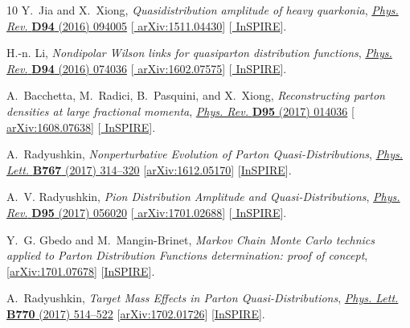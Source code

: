 \begin{thebibliography}{10}
Y.~Jia and X.~Xiong, {\it {Quasidistribution amplitude of heavy quarkonia}},
\href{http://dx.doi.org/10.1103/PhysRevD.94.094005}{{\em Phys. Rev.} {\bfseries
  D94} (2016) 094005} [\href{http://arxiv.org/abs/1511.04430}{{\ttfamily
  arXiv:1511.04430}}] [\href{http://inspirehep.net/record/1404098}{{\ttfamily
  InSPIRE}}].

H.-n. Li, {\it {Nondipolar Wilson links for quasiparton distribution
  functions}},
\href{http://dx.doi.org/10.1103/PhysRevD.94.074036}{{\em Phys. Rev.} {\bfseries
  D94} (2016) 074036} [\href{http://arxiv.org/abs/1602.07575}{{\ttfamily
  arXiv:1602.07575}}] [\href{http://inspirehep.net/record/1423310}{{\ttfamily
  InSPIRE}}].

A.~Bacchetta, M.~Radici, B.~Pasquini, and X.~Xiong, {\it {Reconstructing parton
  densities at large fractional momenta}},
\href{http://dx.doi.org/10.1103/PhysRevD.95.014036}{{\em Phys. Rev.} {\bfseries
  D95} (2017) 014036} [\href{http://arxiv.org/abs/1608.07638}{{\ttfamily
  arXiv:1608.07638}}] [\href{http://inspirehep.net/record/1484292}{{\ttfamily
  InSPIRE}}].

A.~Radyushkin, {\it {Nonperturbative Evolution of Parton Quasi-Distributions}},
\href{http://dx.doi.org/10.1016/j.physletb.2017.02.019}{{\em Phys. Lett.}
  {\bfseries B767} (2017) 314--320}
  [\href{http://arxiv.org/abs/1612.05170}{{\ttfamily arXiv:1612.05170}}]
  [\href{http://inspirehep.net/record/1504066}{{\ttfamily InSPIRE}}].

A.~V. Radyushkin, {\it {Pion Distribution Amplitude and Quasi-Distributions}},
\href{http://dx.doi.org/10.1103/PhysRevD.95.056020}{{\em Phys. Rev.} {\bfseries
  D95} (2017) 056020} [\href{http://arxiv.org/abs/1701.02688}{{\ttfamily
  arXiv:1701.02688}}] [\href{http://inspirehep.net/record/1508491}{{\ttfamily
  InSPIRE}}].

Y.~G. Gbedo and M.~Mangin-Brinet,
{\it {Markov Chain Monte Carlo technics applied to Parton Distribution
  Functions determination: proof of concept}},
  [\href{http://arxiv.org/abs/1701.07678}{{\ttfamily arXiv:1701.07678}}]
  [\href{http://inspirehep.net/record/1510890}{{\ttfamily InSPIRE}}].

A.~Radyushkin, {\it {Target Mass Effects in Parton Quasi-Distributions}},
\href{http://dx.doi.org/10.1016/j.physletb.2017.05.024}{{\em Phys. Lett.}
  {\bfseries B770} (2017) 514--522}
  [\href{http://arxiv.org/abs/1702.01726}{{\ttfamily arXiv:1702.01726}}]
  [\href{http://inspirehep.net/record/1512318}{{\ttfamily InSPIRE}}].


\end{thebibliography}

